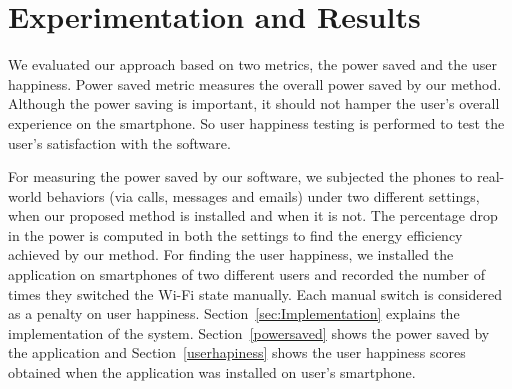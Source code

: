 \section{Experimentation and Results}
\label{sec:Exp}

We evaluated our approach based on two metrics, the power saved and the user happiness.
Power saved metric measures the overall power saved by our method. Although the power
saving is important, it should not hamper the user's overall experience on the smartphone.
So user happiness testing is performed to test the user's satisfaction with the software.

For measuring the power saved by our software, we subjected the phones to real-world behaviors (via calls, messages and emails) under two different settings, when our proposed method is installed and when it is not. The percentage drop in the power is computed in both the settings to find the energy efficiency achieved by our method. For finding the user happiness, we installed the application on smartphones of two different users and recorded the number of times they switched the Wi-Fi state manually. Each manual switch is considered as a penalty on user happiness. Section~\ref{sec:Implementation} explains the implementation of the system. Section~\ref{powersaved} shows the power saved by the application and Section~\ref{userhapiness} shows the user happiness scores obtained when the application was installed on user's smartphone.

